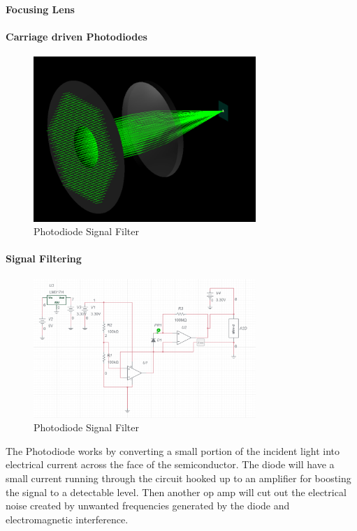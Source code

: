 \paragraph{Focusing Lens}

\paragraph{Carriage driven Photodiodes}

\begin{figure}[H]
    \caption{Photodiode Signal Filter}
    \centering
    \includegraphics[width=0.75\textwidth]{images/ColimatedBeam.png}
\end{figure}

\paragraph{Signal Filtering}

\begin{figure}[H]
    \caption{Photodiode Signal Filter}
    \centering
    \includegraphics[width=0.75\textwidth]{images/ElectricalSignalFilteringSD1.png}
\end{figure}


The Photodiode works by converting a small portion of the incident light into electrical current across the face of the semiconductor. The diode will have a small current running through the circuit hooked up to an amplifier for boosting the signal to a detectable level. Then another op amp will cut out the electrical noise created by unwanted frequencies generated by the diode and electromagnetic interference.

